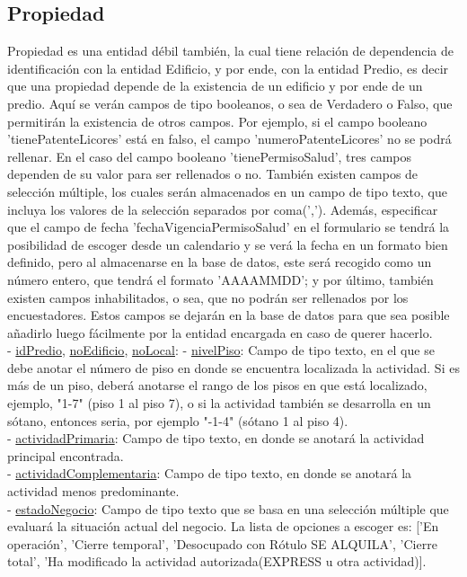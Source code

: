 \subsection{Propiedad}
Propiedad es una entidad débil también, la cual tiene relación de dependencia de identificación con la entidad Edificio, y por ende, con la entidad Predio, es decir que una propiedad depende de la existencia de un edificio y por ende de un predio.
Aquí se verán campos de tipo booleanos, o sea de Verdadero o Falso, que permitirán la existencia de otros campos. Por ejemplo, si el campo booleano 'tienePatenteLicores' está en falso, el campo 'numeroPatenteLicores' no se podrá rellenar. En el
caso del campo booleano 'tienePermisoSalud', tres campos dependen de su valor para ser rellenados o no. También existen campos de selección múltiple, los cuales serán almacenados en un campo de tipo texto, que incluya los valores de la selección
separados por coma(','). Además, especificar que el campo de fecha 'fechaVigenciaPermisoSalud' en el formulario se tendrá la posibilidad de escoger desde un calendario y se verá la fecha en un formato bien definido, pero al almacenarse en la
base de datos, este será recogido como un número entero, que tendrá el formato 'AAAAMMDD'; y por último, también existen campos inhabilitados, o sea, que no podrán ser rellenados por los encuestadores. Estos campos se dejarán en la base de datos
para que sea posible añadirlo luego fácilmente por la entidad encargada en caso de querer hacerlo. \\
- \underline{idPredio}, \underline{noEdificio}, \underline{noLocal}:
- \underline{nivelPiso}:  Campo de tipo texto, en el que se debe anotar el número de piso en donde se encuentra localizada la actividad. Si es más de un piso, deberá anotarse el
rango de los pisos en que está localizado, ejemplo, "1-7" (piso 1 al piso 7), o si la actividad también se desarrolla en un sótano, entonces seria, por ejemplo "$ $-1-4" (sótano 1 al piso 4). \\
- \underline{actividadPrimaria}: Campo de tipo texto, en donde se anotará la actividad principal encontrada. \\
- \underline{actividadComplementaria}:  Campo de tipo texto, en donde se anotará la actividad menos predominante.\\
- \underline{estadoNegocio}: Campo de tipo texto que se basa en una selección múltiple que evaluará la situación actual del negocio. La lista de opciones a escoger es: ['En operación', 'Cierre temporal', 'Desocupado con Rótulo SE ALQUILA', 'Cierre total', 'Ha modificado la actividad autorizada(EXPRESS u otra actividad)].\\
